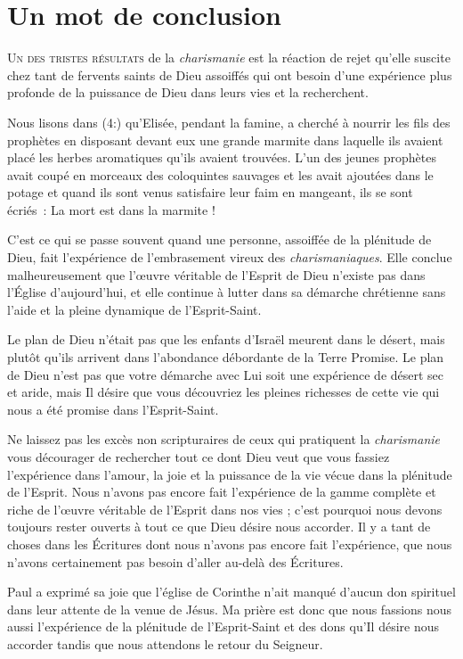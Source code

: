 \chapter{Un mot de conclusion}

\lettrine{U}{n des tristes résultats} de la \emph{charismanie}
 est la réaction de rejet
 qu'elle suscite chez tant de fervents saints de Dieu assoiffés
 qui ont besoin d'une expérience 
 plus profonde de la puissance de Dieu
 dans leurs vies et la recherchent.

Nous lisons dans (4:) qu'Elisée, pendant la famine,
 a cherché à nourrir les fils des prophètes en disposant devant eux
 une grande marmite dans laquelle ils avaient placé les herbes
 aromatiques qu'ils avaient trouvées.
 L'un des jeunes prophètes avait coupé en morceaux des coloquintes
 sauvages et les avait ajoutées dans le potage et quand ils sont venus
 satisfaire leur faim en mangeant, ils se sont écriés~:
 \og La mort est dans la marmite ! \fg{}

C'est ce qui se passe souvent quand une personne,
 assoiffée de la plénitude de Dieu, fait l'expérience 
 de l'embrasement
 vireux des \emph{charismaniaques}. Elle conclue malheureusement
 que l'œuvre véritable de l'Esprit de Dieu n'existe pas
 dans l'Église d'aujourd'hui, et elle continue à lutter
 dans sa démarche chrétienne sans l'aide et la pleine dynamique
 de l'Esprit-Saint.

Le plan de Dieu n'était pas que les enfants d'Israël meurent
 dans le désert, mais plutôt qu'ils arrivent dans l'abondance débordante
 de la Terre Promise. Le plan de Dieu n'est pas que votre démarche
 avec Lui soit une expérience  de désert sec et aride,
 mais Il désire
 que vous découvriez les pleines richesses de cette vie
 qui nous a été promise dans l'Esprit-Saint.

Ne laissez pas les excès non scripturaires de ceux qui pratiquent 
la \emph{charismanie} vous décourager de rechercher tout ce dont Dieu
 veut que vous fassiez l'expérience  dans l'amour,
 la joie et la puissance de la vie vécue dans la plénitude de l'Esprit.
 Nous n'avons pas encore fait l'expérience 
 de la gamme complète
 et riche de l'œuvre véritable de l'Esprit dans nos vies ;
 c'est pourquoi nous devons toujours rester ouverts
 à tout ce que Dieu désire nous accorder.
 Il y a tant de choses dans les Écritures dont nous n'avons pas encore
 fait l'expérience, 
 que nous n'avons certainement pas besoin
 d'aller au-delà des Écritures.

Paul a exprimé sa joie que l'église de Corinthe n'ait manqué
 d'aucun don spirituel dans leur attente de la venue de Jésus.
 Ma prière est donc que nous fassions
 nous aussi l'expérience 
 de la plénitude de l'Esprit-Saint et des dons qu'Il désire
 nous accorder tandis que nous attendons le retour du Seigneur.
\closechapter


